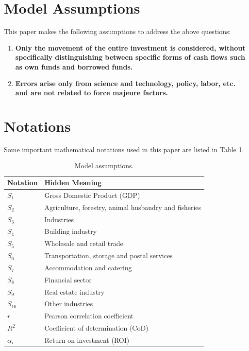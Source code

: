 \documentclass[12pt]{article}  %
\begin{document}
\section{Model Assumptions} %
	This paper makes the following assumptions to address the above questions:
\begin{enumerate}

	\item \textbf{Only the movement of the entire investment is considered, without specifically distinguishing between specific forms of cash flows such as own funds and borrowed funds.}\\
	
	
		\item \textbf{Errors arise only from science and technology, policy, labor, etc. and are not related to force majeure factors.}\\
	
		
		
			
			
			
				
\end{enumerate}


\section{Notations}%
Some important mathematical notations used in this paper are listed in Table 1. 
\begin{table}[htbp]
	\centering
	\caption{Model assumptions.}
	\label{tab:notations}
	\begin{tabular}{ll}
		\toprule
		\textbf{Notation} & \textbf{Hidden Meaning} \\
		\midrule
		$S_1$ & Gross Domestic Product (GDP) \\
		$S_2$ & Agriculture, forestry, animal husbandry and fisheries \\
		$S_3$ & Industries \\
		$S_4$ & Building industry \\
		$S_5$ & Wholesale and retail trade \\
		$S_6$ & Transportation, storage and postal services \\
		$S_7$ & Accommodation and catering \\
		$S_8$ & Financial sector \\
		$S_9$ & Real estate industry \\
		$S_{10}$ & Other industries \\
		$r$ & Pearson correlation coefficient \\
		$R^2$ & Coefficient of determination (CoD) \\
		$\alpha_i$ & Return on investment (ROI) \\
		\bottomrule
	\end{tabular}
\end{table}
\end{document}
